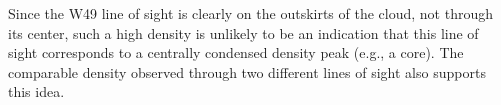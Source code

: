 

Since the W49 line of sight is clearly on the outskirts of the cloud, not
through its center, such a high density is unlikely to be an indication that
this line of sight corresponds to a centrally condensed density peak (e.g., a
core).  The comparable density observed through two different lines of sight
also supports this idea.





